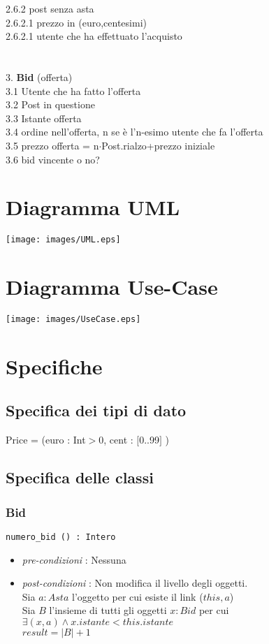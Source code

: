 \documentclass[12pt, letterpaper]{article}
\newcommand{\acc}{\\\hphantom{}\\}
\newcommand{\code}[1]{\colorbox{light-gray}{\texttt{#1}}}
\newcommand{\id}{{\hphantom{ident}}}
\begin{document}
\id\id	2.6.2 post senza asta\\
        \id\id\id		2.6.2.1 prezzo in (euro,centesimi)\\
        \id\id\id		2.6.2.1 utente che ha effettuato l'acquisto\\
\acc
3. \textbf{Bid} (offerta)\\
\id	3.1 Utente che ha fatto l'offerta\\
\id	3.2 Post in questione\\
    \id	3.3 Istante offerta \\
    \id	3.4 ordine nell'offerta, n se è l'n-esimo utente che fa l'offerta\\
    \id	3.5 prezzo offerta = n$\cdot$Post.rialzo+prezzo iniziale\\
    \id	3.6 bid vincente o no?\\
\section{Diagramma UML}\begin{center}
    \texttt{[image: images/UML.eps]}
\end{center}
\newpage
\section{Diagramma Use-Case}\begin{center}
    \texttt{[image: images/UseCase.eps]}
\end{center}
\newpage
\section{Specifiche}
\subsection{Specifica dei tipi di dato}
Price = (euro : Int$>$0, cent : $[$0..99$]$ ) 
\subsection{Specifica delle classi}
\subsubsection{Bid}
\code{numero\_bid () : Intero}\begin{itemize}
    \item \textit{pre-condizioni} : Nessuna
    \item \textit{post-condizioni} : Non modifica il livello degli oggetti.\\ 
    Sia $a:Asta$ l'oggetto per cui esiste il link ($this,a$)\\ 
    Sia $B$ l'insieme di tutti gli oggetti $x:Bid$ per cui $\exists (x,a) \land x.istante<this.istante$\\ 
    $result = |B|+1$ 
\end{itemize}
\end{document}
